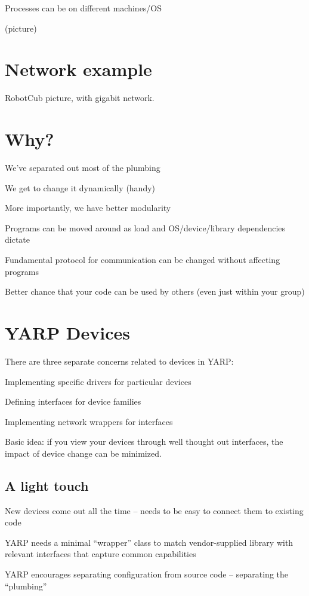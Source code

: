 Processes can be on different machines/OS

(picture)

\section{Network example}

RobotCub picture, with gigabit network.

\section{Why?}

We've separated out most of the plumbing

We get to change it dynamically (handy)

More importantly, we have better modularity

Programs can be moved around as load and OS/device/library
 dependencies dictate

Fundamental protocol for communication can be changed without 
affecting programs

Better chance that your code can be used by others (even just within 
your group)


\section{YARP Devices}

There are three separate concerns related to devices in YARP:

Implementing specific drivers for particular devices 

Defining interfaces for device families 

Implementing network wrappers for interfaces

Basic idea: if you view your devices through well thought out
interfaces, the impact of device change can be minimized.


\subsection{A light touch}

New devices come out all the time -- needs to be easy to connect them
to existing code

YARP needs a minimal ``wrapper'' class to match vendor-supplied
library with relevant interfaces that capture common capabilities

YARP encourages separating configuration from source code -- separating
the ``plumbing''

